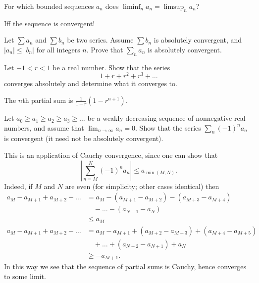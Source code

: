 \begin{problem}
	For which bounded sequences $a_n$
	does $\liminf_n a_n = \limsup_n a_n$?
	\begin{hint}
		Iff the sequence is convergent!
	\end{hint}
\end{problem}

\begin{dproblem}
	Let $\sum a_n$ and $\sum b_n$ be two series.
	Assume $\sum b_n$ is absolutely convergent,
	and $|a_n| \le |b_n|$ for all integers $n$.
	Prove that $\sum_n a_n$ is absolutely convergent.
\end{dproblem}

\begin{problem}
	\label{prob:geometric}
	Let $-1 < r < 1$ be a real number.
	Show that the series
	\[ 1 + r + r^2 + r^3 + \dots \]
	converges absolutely and determine what it converges to.
	\begin{hint}
		The $n$th partial sum is $\frac{1}{1-r} (1-r^{n+1})$.
	\end{hint}
\end{problem}


\begin{problem}
	Let $a_0 \ge a_1 \ge a_2 \ge a_3 \ge \dots$ be a weakly decreasing sequence
	of nonnegative real numbers,
	and assume that $\lim_{n \to \infty} a_n = 0$.
	Show that the series $\sum_n (-1)^n a_n$ is convergent
	(it need not be absolutely convergent).
	\begin{sol}
		This is an application of Cauchy convergence, since
		one can show that
		\[ \left\lvert \sum_{n=M}^N (-1)^n a_n \right\rvert \le a_{\min(M,N)}. \]
		Indeed, if $M$ and $N$ are even
		(for simplicity; other cases identical) then
		\begin{align*}
			a_M - a_{M+1} + a_{M+2} - \dots
			&= a_M - (a_{M+1}-a_{M+2}) - (a_{M+3}-a_{M+4}) \\
			&\quad- \dots - (a_{N-1} - a_N) \\
			&\le a_M \\
			a_M - a_{M+1} + a_{M+2} - \dots
			&= a_M - a_{M+1} + (a_{M+2} - a_{M+3}) + (a_{M+4} - a_{M+5}) \\
			&\quad+ \dots + (a_{N-2} - a_{N+1}) + a_N \\
			&\ge -a_{M+1}.
		\end{align*}
		In this way we see that the sequence of partial sums is Cauchy,
		hence converges to some limit.
	\end{sol}
\end{problem}


